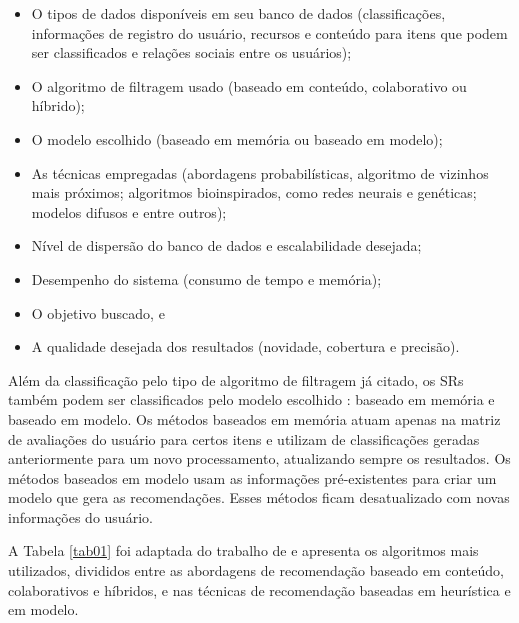 \begin{itemize}

	\item O tipos de dados disponíveis em seu banco de dados (classificações, informações de registro do usuário, recursos e conteúdo para itens que podem ser
	classificados e relações sociais entre os usuários); 

	\item O algoritmo de filtragem usado (baseado em conteúdo, colaborativo ou híbrido);

	\item O modelo escolhido (baseado em memória ou baseado em modelo);
	
	\item As técnicas empregadas (abordagens probabilísticas, algoritmo de vizinhos mais próximos;
	algoritmos bioinspirados, como redes neurais e genéticas; modelos difusos e entre outros);
	
	\item  Nível de dispersão do banco de dados e escalabilidade desejada;

	\item  Desempenho do sistema (consumo de tempo e memória);

	\item  O objetivo buscado, e

	\item A qualidade desejada dos resultados (novidade, cobertura e
   precisão).

\end{itemize}

Além da classificação pelo tipo de algoritmo de filtragem já citado, os SRs também podem 
ser classificados pelo modelo escolhido \cite{bobadilla2013}: baseado em memória e baseado em modelo. 
Os métodos baseados em memória atuam apenas na matriz de avaliações do usuário para certos itens e utilizam de 
classificações geradas anteriormente para um novo processamento, atualizando sempre os resultados. 
Os métodos baseados em modelo usam as informações pré-existentes para criar um
modelo que gera as recomendações. Esses métodos ficam desatualizado com novas informações do usuário.

A Tabela \ref{tab01} foi adaptada do trabalho de  e apresenta os algoritmos mais utilizados, 
divididos entre as abordagens de recomendação baseado em conteúdo, colaborativos e híbridos, e nas técnicas 
de recomendação baseadas em heurística e em modelo. 

